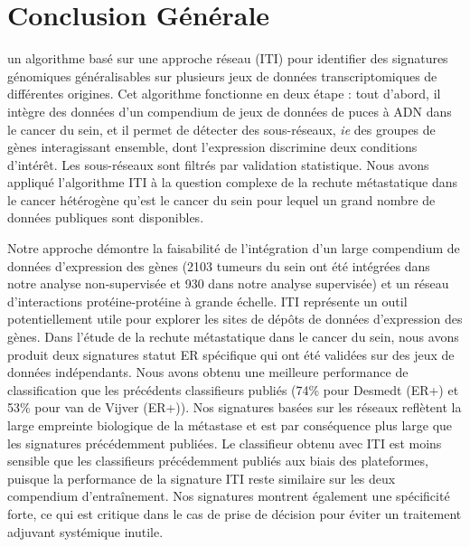 \singlespacing

	\newpage

\doublespacing

	\section*{\textcolor{blue!45!black}{Conclusion Générale}}
		 un algorithme basé sur une approche réseau (ITI) pour identifier des signatures génomiques généralisables sur plusieurs jeux de données transcriptomiques de différentes origines.
		Cet algorithme fonctionne en deux étape : tout d'abord, il intègre des données d'un compendium de jeux de données de puces à ADN dans le cancer du sein, et il permet de détecter des sous-réseaux, \emph{ie} des groupes de gènes interagissant ensemble, dont l'expression discrimine deux conditions d'intérêt.
		Les sous-réseaux sont filtrés par validation statistique.
		Nous avons appliqué l'algorithme ITI à la question complexe de la rechute métastatique dans le cancer hétérogène qu'est le cancer du sein pour lequel un grand nombre de données publiques sont disponibles.

		Notre approche démontre la faisabilité de l'intégration d'un large compendium de données d'expression des gènes (2103 tumeurs du sein ont été intégrées dans notre analyse non-supervisée et 930 dans notre analyse supervisée) et un réseau d'interactions protéine-protéine à grande échelle.
		ITI représente un outil potentiellement utile pour explorer les sites de dépôts de données d'expression des gènes.
		Dans l'étude de la rechute métastatique dans le cancer du sein, nous avons produit deux signatures statut ER spécifique qui ont été validées sur des jeux de données indépendants.
		Nous avons obtenu une meilleure performance de classification que les précédents classifieurs publiés (74\% pour Desmedt (ER+) et 53\% pour van de Vijver (ER+)).
		Nos signatures basées sur les réseaux reflètent la large empreinte biologique de la métastase et est par conséquence plus large que les signatures précédemment publiées.
		Le classifieur obtenu avec ITI est moins sensible que les classifieurs précédemment publiés aux biais des plateformes, puisque la performance de la signature ITI reste similaire sur les deux compendium d'entraînement.
		Nos signatures montrent également une spécificité forte, ce qui est critique dans le cas de prise de décision pour éviter un traitement adjuvant systémique inutile.

